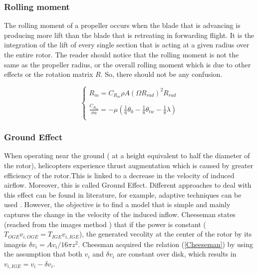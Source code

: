 \documentclass{thesisreport}
\begin{document}
\newpage

\subsubsection*{Rolling moment}


The rolling moment of a propeller occurs when the blade that is advancing is producing more lift than the blade that is retreating in forwarding flight. It is the integration of the lift of every single section that is acting at a given radius over the entire rotor.
The reader should notice that the rolling moment is not the same as the propeller radius, or the overall rolling moment which is due to other effects or the rotation matrix $R$. So, there should not be any confusion.

\begin{equation}
\begin{cases}
R_m = C_{R_m}\rho A (\Omega R_{rad})^2 R_{rad} \\
\\
\frac{C_{R_m}}{\sigma a} = -\mu (\frac{1}{6} \theta_0 - \frac{1}{8} \theta_{tw} - \frac{1}{8} \lambda)\\
\end{cases}
\end{equation}

\subsubsection*{Ground Effect}


When operating near the ground ( at a height equivalent to half the diameter of the rotor), helicopters experience thrust augmentation which is caused by greater efficiency of the rotor.This is linked to a decrease in the velocity of induced airflow. Moreover, this is called Ground Effect. Different approaches to deal with this effect can be found in literature, for example, adaptive techniques can  be used \cite{Guenard2006}.
However, the objective is to find a model that is simple and mainly captures the change in the velocity of the induced inflow.
Cheeseman \cite{Cheeseman1957} states (reached from the images method \cite{Griffiths2002}) that if the power is constant ($T_{OGE}v_{i,OGE} = T_{IGE}v_{i,IGE}$), the generated vecolity at the center of the rotor by its imageis $\delta v_i = Av_i/16 \pi z^2$.
Cheesman acquired the relation (\ref{Cheeseman}) by using the assumption that both $v_i$ and $\delta v_i$ are constant over disk, which results in $v_{i,IGE}=v_i-\delta v_i$.
\end{document}
